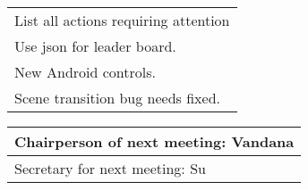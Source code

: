 \documentclass{article}
\begin{document}
\begin{table}[H]
	\centering
	\begin{tabular}{| p{12cm}  |}
	\hline
	List all actions requiring attention \\ 
    Use json for leader board. \\
    New Android controls. \\ 
    Scene transition bug needs fixed.\\ \hline
\end{tabular}
\end{table}

\begin{table}[H]
	\centering
	\begin{tabular}{| p{12cm}  |}
	\hline
	Chairperson of next meeting: Vandana\\ \hline
	Secretary for next meeting: Su \\ \hline
\end{tabular}
\end{table}
\end{document}
